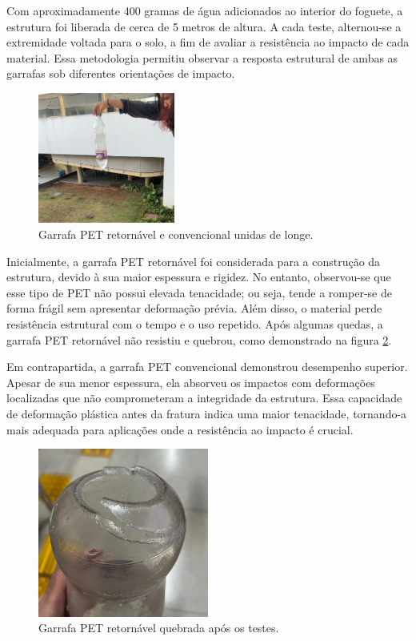 Com aproximadamente 400 gramas de água adicionados ao interior do foguete, a estrutura foi liberada de cerca de 5 metros de altura. A cada teste, alternou-se a extremidade voltada para o solo, a fim de avaliar a resistência ao impacto de cada material. Essa metodologia permitiu observar a resposta estrutural de ambas as garrafas sob diferentes orientações de impacto. 

\begin{figure}[H]
	\centering
	\includegraphics[width=0.4\textwidth,height=\textheight,keepaspectratio]{figuras/estruturas/foto_convencional.png}
	\caption{Garrafa PET retornável e convencional unidas de longe.}
	\label{fig_garrafa_pet_unidas_longe}
\end{figure}

Inicialmente, a garrafa PET retornável foi considerada para a construção da estrutura, devido à sua maior espessura e rigidez. No entanto, observou-se que esse tipo de PET não possui elevada tenacidade; ou seja, tende a romper-se de forma frágil sem apresentar deformação prévia. Além disso, o material perde resistência estrutural com o tempo e o uso repetido. Após algumas quedas, a garrafa PET retornável não resistiu e quebrou, como demonstrado na figura \ref{fig_garrafa_pet_quebrada}.

Em contrapartida, a garrafa PET convencional demonstrou desempenho superior. Apesar de sua menor espessura, ela absorveu os impactos com deformações localizadas que não comprometeram a integridade da estrutura. Essa capacidade de deformação plástica antes da fratura indica uma maior tenacidade, tornando-a mais adequada para aplicações onde a resistência ao impacto é crucial.

\begin{figure}[H]
	\centering
	\includegraphics[width=0.5\textwidth,height=\textheight,keepaspectratio]{figuras/estruturas/quebrado.png}
	\caption{Garrafa PET retornável quebrada após os testes.}
	\label{fig_garrafa_pet_quebrada}
\end{figure}

